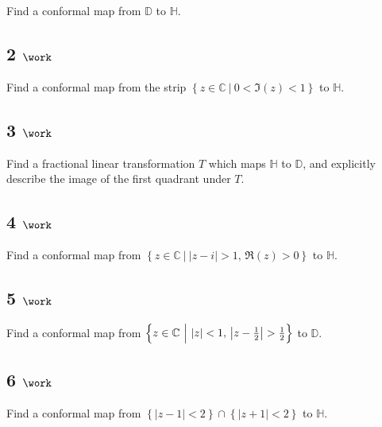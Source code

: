 Find a conformal map from \({\mathbb{D}}\) to \({\mathbb{H}}\).

\hypertarget{work-53}{%
\subsection{\texorpdfstring{2
\(\work\)}{2 \textbackslash work}}\label{work-53}}

Find a conformal map from the strip
\(\left\{{z\in {\mathbb{C}}{~\mathrel{\Big|}~}0 < \Im(z) < 1}\right\}\)
to \({\mathbb{H}}\).

\hypertarget{work-54}{%
\subsection{\texorpdfstring{3
\(\work\)}{3 \textbackslash work}}\label{work-54}}

Find a fractional linear transformation \(T\) which maps
\({\mathbb{H}}\) to \({\mathbb{D}}\), and explicitly describe the image
of the first quadrant under \(T\).

\hypertarget{work-55}{%
\subsection{\texorpdfstring{4
\(\work\)}{4 \textbackslash work}}\label{work-55}}

Find a conformal map from
\(\left\{{z\in {\mathbb{C}}{~\mathrel{\Big|}~}{\left\lvert {z-i} \right\rvert} > 1,\, \Re(z) > 0}\right\}\)
to \({\mathbb{H}}\).

\hypertarget{work-56}{%
\subsection{\texorpdfstring{5
\(\work\)}{5 \textbackslash work}}\label{work-56}}

Find a conformal map from
\(\left\{{z\in {\mathbb{C}}{~\mathrel{\Big|}~}{\left\lvert {z} \right\rvert} < 1,\, {\left\lvert {z - {1\over 2}} \right\rvert} > {1\over 2} }\right\}\)
to \({\mathbb{D}}\).

\hypertarget{work-57}{%
\subsection{\texorpdfstring{6
\(\work\)}{6 \textbackslash work}}\label{work-57}}

Find a conformal map from
\(\left\{{{\left\lvert {z-1} \right\rvert} < 2}\right\} \cap\left\{{{\left\lvert {z+1} \right\rvert} < 2}\right\}\)
to \({\mathbb{H}}\).

